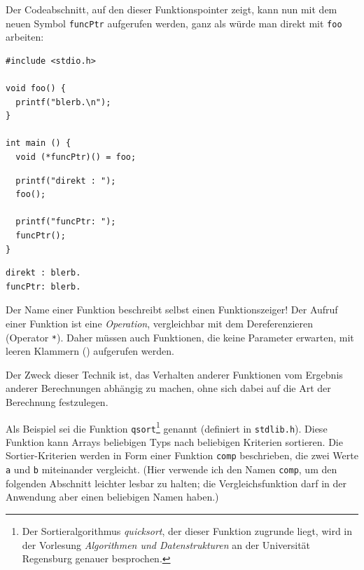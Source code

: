 Der Codeabschnitt, auf den dieser Funktionspointer zeigt, kann nun mit dem neuen Symbol \texttt{funcPtr} aufgerufen werden, ganz als würde man direkt mit \texttt{foo} arbeiten:

\begin{codebox}
\begin{verbatim}
#include <stdio.h>

void foo() {
  printf("blerb.\n");
}

int main () {
  void (*funcPtr)() = foo;
\end{verbatim}
\end{codebox}
%
\begin{codebox}[]
\begin{verbatim}
  printf("direkt : ");
  foo();

  printf("funcPtr: ");
  funcPtr();
}
\end{verbatim}
\end{codebox}

\begin{cmdbox}
\begin{verbatim}
direkt : blerb.
funcPtr: blerb.
\end{verbatim}
\end{cmdbox}

\begin{hintbox}
Der Name einer Funktion beschreibt selbst einen Funktionszeiger! Der Aufruf einer Funktion ist eine \emph{Operation}, vergleichbar mit dem Dereferenzieren (Operator \texttt{*}). Daher müssen auch Funktionen, die keine Parameter erwarten, mit leeren Klammern () aufgerufen werden.
\end{hintbox}

Der Zweck dieser Technik ist, das Verhalten anderer Funktionen vom Ergebnis anderer Berechnungen abhängig zu machen, ohne sich dabei auf die Art der Berechnung festzulegen.

Als Beispiel sei die Funktion \texttt{qsort}\footnote{Der Sortieralgorithmus \emph{quicksort}, der dieser Funktion zugrunde liegt, wird in der Vorlesung \emph{Algorithmen und Datenstrukturen} an der Universität Regensburg genauer besprochen.} genannt (definiert in \texttt{stdlib.h}). Diese Funktion kann Arrays beliebigen Typs nach beliebigen Kriterien sortieren. Die Sortier-Kriterien werden in Form einer Funktion \texttt{comp} beschrieben, die zwei Werte \texttt{a} und \texttt{b} miteinander vergleicht. (Hier verwende ich den Namen \texttt{comp}, um den folgenden Abschnitt leichter lesbar zu halten; die Vergleichsfunktion darf in der Anwendung aber einen beliebigen Namen haben.)


